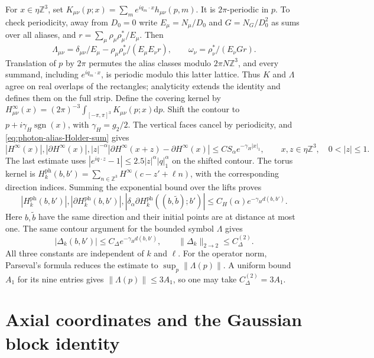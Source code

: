 \documentclass[11pt,letterpaper,reqno]{amsart}
\newcommand{\Z}{\mathbb Z}
\newcommand{\dd}{\mathrm d}
\begin{document}
For $x\in\eta\Z^3$, set
$K_{\mu\nu}(p;x)=\sum_me^{iq_m\cdot x}h_{\mu\nu}(p,m)$.
It is $2\pi$-periodic in $p$. To check periodicity, away from $D_0=0$
write $E_\mu=N_\mu/D_0$ and $G=N_G/D_0^2$ as sums over all aliases,
and $r=\sum_\mu\rho_\mu\rho_\mu^*/E_\mu$. Then
\[
 \Lambda_{\mu\nu}=\delta_{\mu\nu}/E_\mu
                  -\rho_\mu\rho_\nu^*/(E_\mu E_\nu r),\qquad
 \omega_\nu=\rho_\nu^*/(E_\nu Gr).
\]
Translation of $p$ by $2\pi$ permutes the alias classes modulo
$2\pi N\Z^3$, and every summand, including $e^{iq_m\cdot x}$,
is periodic modulo this latter lattice. Thus $K$ and $\Lambda$
agree on real overlaps of the rectangles; analyticity extends the
identity and defines them on the full strip. Define the covering
kernel by
$H_{\mu\nu}^\infty(x)=(2\pi)^{-3}\int_{[-\pi,\pi]^3}K_{\mu\nu}(p;x)\dd p$.
Shift the contour to $p+i\gamma_H\operatorname{sgn}(x)$, with
$\gamma_H=g_2/2$. The vertical faces cancel by periodicity, and
\eqref{eq:photon-alias-Holder-sum} gives
\[
 |H^\infty(x)|, |\partial H^\infty(x)|,
 |z|^{-\alpha}|\partial H^\infty(x+z)-\partial H^\infty(x)|
          \le C S_\alpha e^{-\gamma_H|x|_1},
 \qquad x,z\in\eta\Z^3,\quad0<|z|\le1.
\]
The last estimate uses
$|e^{iq\cdot z}-1|\le2.5|z|^\alpha|q|_1^\alpha$ on the shifted
contour. The torus kernel is
$H_k^{\mathrm{ph}}(b,b')=\sum_{n\in\Z^3}H^\infty(c-z'+\ell n)$,
with the corresponding direction indices. Summing the exponential
bound over the lifts proves
\begin{equation}\label{eq:photon-kernel-regularity}
 |H_k^{\mathrm{ph}}(b,b')|, |\partial H_k^{\mathrm{ph}}(b,b')|,
 |\delta_\alpha\partial H_k^{\mathrm{ph}}((b,\tilde b);b')|
                 \le C_H(\alpha)e^{-\gamma_Hd(b,b')}.
\end{equation}
Here $b,\tilde b$ have the same direction and their initial points
are at distance at most one. The same contour argument for the bounded
symbol $\Lambda$ gives
\begin{equation}\label{eq:photon-form-kernel-decay}
 |\Delta_k(b,b')|\le C_\Delta e^{-\gamma_Hd(b,b')},\qquad
 \|\Delta_k\|_{2\to2}\le C_\Delta^{(2)}.
\end{equation}
All three constants are independent of $k$ and $\ell$.
For the operator norm, Parseval's formula reduces the estimate to
$\sup_p\|\Lambda(p)\|$. A uniform bound $A_1$ for its nine entries
gives $\|\Lambda(p)\|\le3A_1$, so one may take
$C_\Delta^{(2)}=3A_1$.

\section{Axial coordinates and the Gaussian block identity}\label{sec:axial}
\end{document}
